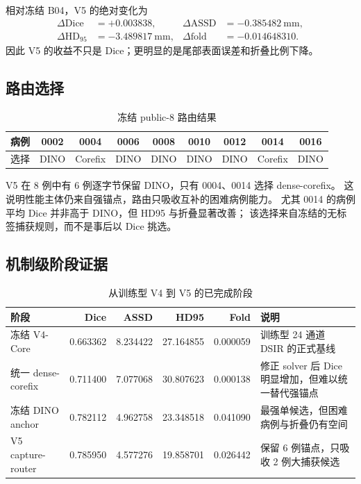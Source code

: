 \documentclass[11pt,a4paper]{ctexart}
\newcommand{\Dice}{\mathrm{Dice}}
\newcommand{\ASSD}{\mathrm{ASSD}}
\newcommand{\HD}{\mathrm{HD}_{95}}
\begin{document}
相对冻结 B04，V5 的绝对变化为
\[
\begin{aligned}
\Delta\Dice&=+0.003838,&
\Delta\ASSD&=-0.385482\ \mathrm{mm},\\
\Delta\HD&=-3.489817\ \mathrm{mm},&
\Delta\mathrm{fold}&=-0.014648310.
\end{aligned}
\]
因此 V5 的收益不只是 Dice；更明显的是尾部表面误差和折叠比例下降。

\subsection{路由选择}
\begin{table}[htbp]
\centering
\caption{冻结 public-8 路由结果}
\begin{tabular}{ccccccccc}
\toprule
病例 & 0002 & 0004 & 0006 & 0008 & 0010 & 0012 & 0014 & 0016\\
\midrule
选择 & DINO & Corefix & DINO & DINO & DINO & DINO & Corefix & DINO\\
\bottomrule
\end{tabular}
\end{table}
V5 在 8 例中有 6 例逐字节保留 DINO，只有 0004、0014 选择 dense-corefix。
这说明性能主体仍来自强锚点，路由只吸收互补的困难病例能力。
尤其 0014 的病例平均 Dice 并非高于 DINO，但 HD95 与折叠显著改善；
该选择来自冻结的无标签捕获规则，而不是事后以 Dice 挑选。

\subsection{机制级阶段证据}
\begin{table}[htbp]
\centering
\small
\caption{从训练型 V4 到 V5 的已完成阶段}
\begin{tabular}{p{3.7cm}rrrrp{4.0cm}}
\toprule
阶段 & Dice & ASSD & HD95 & Fold & 说明\\
\midrule
冻结 V4-Core & 0.663362 & 8.234422 & 27.164855 & 0.000059 &
训练型 24 通道 DSIR 的正式基线\\
统一 dense-corefix & 0.711400 & 7.077068 & 30.807623 & 0.000138 &
修正 solver 后 Dice 明显增加，但难以统一替代强锚点\\
冻结 DINO anchor & 0.782112 & 4.962758 & 23.348518 & 0.041090 &
最强单候选，但困难病例与折叠仍有空间\\
V5 capture-router & 0.785950 & 4.577276 & 19.858701 & 0.026442 &
保留 6 例锚点，只吸收 2 例大捕获候选\\
\bottomrule
\end{tabular}
\end{table}
\end{document}
